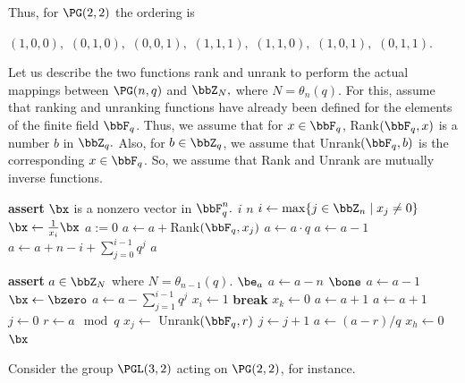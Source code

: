 Thus, for $\PG(2,2)$ the  ordering is
\begin{center}
$(1,0,0),$
$(0,1,0),$
$(0,0,1),$
$(1,1,1),$
$(1,1,0),$
$(1,0,1),$
$(0,1,1).$
\end{center}
Let us describe the two functions rank and unrank 
to perform the actual mappings 
between $\PG(n,q)$ and $\bbZ_{N},$ where $N = \theta_n(q).$
For this, assume that ranking and unranking 
functions have already been defined for the 
elements of the finite field $\bbF_q$.
Thus, we assume that for $x \in \bbF_q$, 
{\sc Rank}$(\bbF_q,x)$ is a number $b$ in $\bbZ_q.$
Also, for $b \in \bbZ_q$, 
we assume that {\sc Unrank}$(\bbF_q,b)$ is the 
corresponding $x \in \bbF_q$.
So, we assume that 
{\sc Rank} and {\sc Unrank} are mutually inverse functions.  
\begin{algorithm}
\caption{Rank}\label{algo:Rank}
\begin{algorithmic}[1]
\State \textbf{assert} $\bx$ is a nonzero vector in $\bbF_q^n.$
\State \Return $i$
\EndIf
\If {$\bx = \bone$} 
\State \Return $n$
\EndIf
\State $i \gets \max\{j \in \bbZ_n \mid x_j \neq 0\}$
\State $\bx \gets \frac{1}{x_i} \bx$
\State $a := 0$
\State $a \gets a + ${\sc Rank}$(\bbF_q, x_j)$
\State $ a \gets a \cdot q$
\EndIf
\EndFor
{} 
\State $ a \gets a - 1$
\EndIf
\State $ a \gets a+ n - i + \sum_{j=0}^{i-1} q^j$
\State \Return $a$
\EndProcedure
\end{algorithmic}
\end{algorithm}
\begin{algorithm}
\caption{Unrank}\label{algo:Unrank}
\begin{algorithmic}[1]
\State \textbf{assert} $a \in \bbZ_N$ where $N = \theta_{n-1}(q).$
\State \Return $\be_a$
\EndIf
\State $a \gets a - n$
\State \Return $\bone$
\EndIf
\State $a \gets a - 1$
\State $\bx \gets \bzero$
\State $a \gets a - \sum_{j=1}^{i-1}q^j$
\Else
\State $x_i \gets 1$
\State \textbf{break}
\EndIf
\EndFor
{}
\State $x_k \gets 0$
\EndFor
\State $a \gets a + 1$
\State $ a \gets a + 1$
\EndIf
\State $j \gets 0$
\State $r \gets a \mod q$
\State $x_j \gets $ {\sc Unrank}$(\bbF_q,r)$
\State $j \gets j + 1$
\State $a \gets (a - r)/q$
\EndWhile
{}
\State $x_h \gets 0$
\EndFor
\State \Return $\bx$
\EndProcedure
\end{algorithmic}
\end{algorithm}
Consider the group $\PGL(3,2)$ acting on $\PG(2,2)$, 
for instance. 




